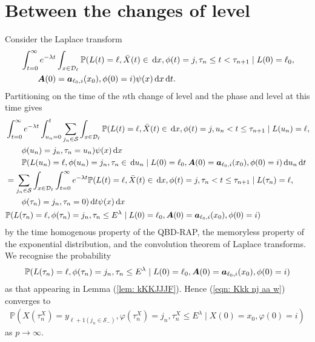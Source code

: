 \section{Between the changes of level}\label{sec: between n and np1}
Consider the Laplace transform 
\begin{align}
		\nonumber&\int_{t=0}^\infty e^{-\lambda t}\int_{x\in\mathcal{D}_\ell}\mathbb P(L(t) = \ell, \bar X(t)\in\, \mathrm{d} x, \phi(t) = j, \tau_{n}\leq t<\tau_{n+1} \mid L(0)=\ell_0, 
		\\&\qquad \boldsymbol A(0)=\boldsymbol a_{\ell_0,i}(x_0), \phi(0)=i)\psi(x)\, \mathrm{d} x\, \mathrm{d} t.
\end{align}
Partitioning on the time of the \(n\)th change of level and the phase and level at this time gives
\begin{align}
	&\int_{t=0}^\infty e^{-\lambda t} \int_{u_n=0}^t\sum_{j_n\in\mathcal S}
	\int_{x\in\mathcal{D}_\ell}\mathbb P(L(t) = \ell, \bar X(t) \in \, \mathrm{d} x, \phi(t) = j, 
	u_n<t \leq \tau_{n+1} \mid L(u_n) = \ell, \nonumber 
	 \\&\qquad{}\phi(u_n) = j_n, \tau_{n}= u_n)\psi(x)\, \mathrm{d} x \nonumber
	 \\&\qquad{}\mathbb P(L(u_n) = \ell, \phi(u_n) = j_n, \tau_{n}\in \, \mathrm{d} u_n 
	 \mid L(0)=\ell_0, \boldsymbol A(0)=\boldsymbol  a_{\ell_0,i}(x_0), \phi(0)=i)\, \mathrm{d} u_n\, \mathrm{d} t \nonumber 
	 \\&= \sum_{j_n\in\mathcal S}
	\int_{x\in\mathcal{D}_\ell} \int_{t=0}^\infty e^{-\lambda t} \mathbb P(L(t) = \ell, \bar X(t) \in \, \mathrm{d} x, \phi(t) = j, 
	\tau_n<t \leq \tau_{n+1} \mid L(\tau_n) = \ell, \nonumber 
	 \\&\qquad{}\phi(\tau_n) = j_n, \tau_{n}= 0)\, \mathrm{d} t \psi(x)\, \mathrm{d} x \nonumber
	 \\&\mathbb P(L(\tau_n) = \ell, \phi(\tau_n) = j_n, \tau_{n}\leq E^\lambda 
	 \mid L(0)=\ell_0, \boldsymbol A(0)=\boldsymbol  a_{\ell_0,i}(x_0), \phi(0)=i) \label{eqn: l whkrqvlkjbrd}
\end{align}
by the time homogenous property of the QBD-RAP, the memoryless property of the exponential distribution, and the convolution theorem of Laplace transforms. We recognise the probability 
\begin{align}
	\mathbb P(L(\tau_n) = \ell, \phi(\tau_n) = j_n, \tau_{n}\leq E^\lambda 
	 \mid L(0)=\ell_0, \boldsymbol A(0)=\boldsymbol  a_{\ell_0,i}(x_0), \phi(0)=i) \label{eqn: Kkk nj aa w}
\end{align}
as that appearing in Lemma (\ref{lem: kKKJJJF}). Hence (\ref{eqn: Kkk nj aa w}) converges to 
\begin{align}
	\mathbb P(X(\tau_n^X) = y_{\ell+1(j_{n}\in\mathcal S_-)}, 
		\varphi(\tau_n^X) = j_n, \tau_{n}^X\leq E^\lambda
		\mid X(0)=x_0, \varphi(0)=i)
\end{align}
as \(p\to\infty\). 

